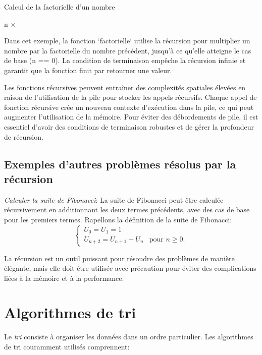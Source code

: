 \begin{algorithm}
	\caption{Calcul de la factorielle d'un nombre}
	\begin{algorithmic}
		\State {}
		\Else
		\State \Return n $\times$ 
	    \EndIf
		\EndFunction
	\end{algorithmic}
\end{algorithm}

Dans cet exemple, la fonction `factorielle` utilise la récursion pour multiplier un nombre par la factorielle du nombre précédent, jusqu'à ce qu'elle atteigne le cas de base (n == 0). La condition de terminaison empêche la récursion infinie et garantit que la fonction finit par retourner une valeur.

Les fonctions récursives peuvent entraîner des complexités spatiales élevées en raison de l'utilisation de la pile pour stocker les appels récursifs. Chaque appel de fonction récursive crée un nouveau contexte d'exécution dans la pile, ce qui peut augmenter l'utilisation de la mémoire. Pour éviter des débordements de pile, il est essentiel d'avoir des conditions de terminaison robustes et de gérer la profondeur de récursion.

\subsection*{Exemples d'autres problèmes résolus par la récursion}
\textit{Calculer la suite de Fibonacci}: La suite de Fibonacci peut être calculée récursivement en additionnant les deux termes précédents, avec des cas de base pour les premiers termes. Rapellons la d\'efinition de la suite de Fibonacci: 
\[ \begin{cases}
	U_0 = U_1 = 1 & \\
	U_{n+2} = U_{n+1} + U_{n} & \text{pour } n\ge 0.
\end{cases} \]


La récursion est un outil puissant pour résoudre des problèmes de manière élégante, mais elle doit être utilisée avec précaution pour éviter des complications liées à la mémoire et à la performance.

\section{Algorithmes de tri}

Le \emph{tri} consiste à organiser les données dans un ordre particulier. Les algorithmes de tri couramment utilisés comprennent:

